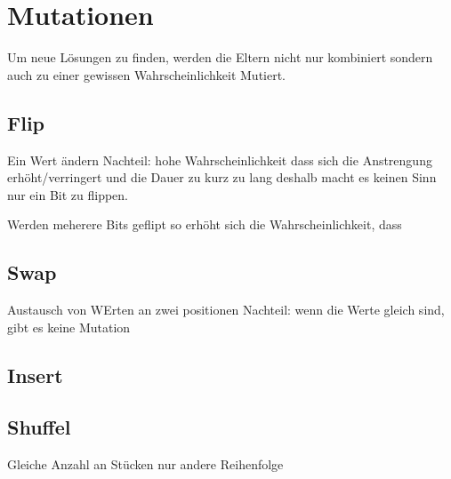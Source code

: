 \section{Mutationen}\label{sec:mutation}
Um neue Lösungen zu finden, werden die Eltern nicht nur kombiniert sondern auch zu
einer gewissen Wahrscheinlichkeit Mutiert.
\subsection{Flip}
Ein Wert ändern
Nachteil: hohe Wahrscheinlichkeit dass sich die Anstrengung erhöht/verringert und die Dauer zu kurz zu lang
deshalb macht es keinen Sinn nur ein Bit zu flippen.

Werden meherere Bits geflipt so erhöht sich die Wahrscheinlichkeit, dass
\subsection{Swap}
Austausch von WErten an zwei positionen
Nachteil: wenn die Werte gleich sind, gibt es keine Mutation
\subsection{Insert}
\subsection{Shuffel}

Gleiche Anzahl an Stücken nur andere Reihenfolge